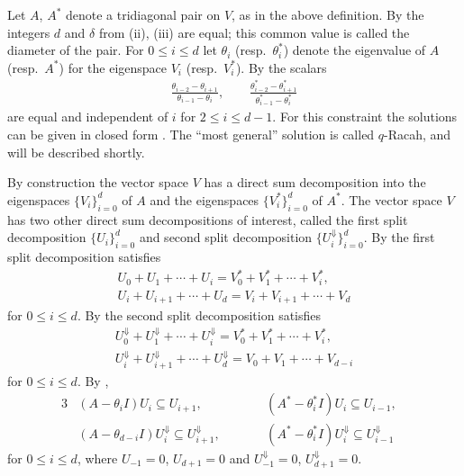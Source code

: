 \documentclass[pdftex]{sigma}
\numberwithin{equation}{section}
\begin{document}
Let $A$, $A^*$ denote a tridiagonal pair on $V$, as in the above definition.
By
\cite[Lemma~4.5]{TD00}
the integers $d$ and $\delta$ from (ii), (iii) are equal;
this common value is called the diameter of the pair.
For $0 \leq i \leq d$ let $\theta_i$ (resp.~$\theta^*_i$) denote
the eigenvalue of $A$ (resp.~$A^*$) for the eigenspace $V_i$
(resp.~$V^*_i$). By \cite[Theorem~11.1]{TD00} the scalars
\begin{gather*}
\frac{\theta_{i-2}-\theta_{i+1}}{\theta_{i-1}-\theta_i},
\qquad
\frac{\theta^*_{i-2}-\theta^*_{i+1}}{\theta^*_{i-1}-\theta^*_i}
\end{gather*}
are equal and independent of $i$ for $2 \leq i \leq d-1$. For
this constraint the solutions can be given in closed form
\cite[Theorem~11.2]{TD00}.
The ``most general'' solution is called $q$-Racah, and will
be described shortly.

By construction the vector space $V$
has a direct sum decomposition into the eigenspaces
$\lbrace V_i\rbrace_{i=0}^d$
of $A$
and the eigenspaces $\lbrace V^*_i\rbrace_{i=0}^d$ of $A^*$.
The vector space $V$ has
two other direct sum decompositions of interest,
called the first split decomposition
$\lbrace U_i\rbrace_{i=0}^d$ and
second split decomposition
$\big\lbrace U^\Downarrow_i\big\rbrace_{i=0}^d$.
By \cite[Theorem~4.6]{TD00}
the first split decomposition satisfies
\begin{gather*}
U_0 + U_1+ \cdots + U_i = V^*_0 + V^*_1 + \cdots + V^*_i,
\\
U_i + U_{i+1}+ \cdots + U_d = V_i + V_{i+1} + \cdots + V_d
\end{gather*}
for $0 \leq i \leq d$.
By \cite[Theorem~4.6]{TD00}
the second split decomposition satisfies
\begin{gather*}
U^\Downarrow_0 + U^\Downarrow_1+ \cdots + U^\Downarrow_i = V^*_0 + V^*_1 + \cdots + V^*_i,
\\
U^\Downarrow_i + U^\Downarrow_{i+1}+ \cdots + U^\Downarrow_d =
V_0 + V_{1} + \cdots + V_{d-i}
\end{gather*}
for $0 \leq i \leq d$.
By \cite[Theorem~4.6]{TD00},
\begin{alignat*}{3}
& (A-\theta_i I)U_i \subseteq U_{i+1},
\qquad && (A^*-\theta^*_i I) U_i \subseteq U_{i-1},&
\\
& (A-\theta_{d-i} I)U^\Downarrow_i \subseteq U^\Downarrow_{i+1},
 \qquad&& (A^*-\theta^*_i I) U^\Downarrow_i \subseteq U^\Downarrow_{i-1}&
\end{alignat*}
for $0 \leq i \leq d$, where $U_{-1}=0$, $U_{d+1}=0$
and $U^\Downarrow_{-1}=0$, $U^\Downarrow_{d+1}=0$.
\end{document}
